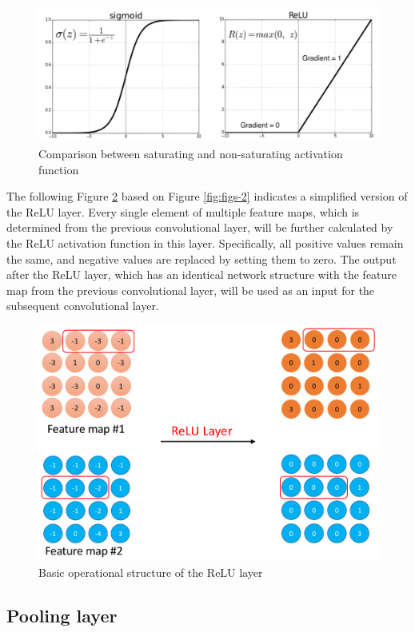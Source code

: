 \documentclass[]{krantz}
\begin{document}
\begin{figure}[ht]

{\centering \includegraphics[width=0.6\linewidth]{figures/01-03-cnns-and-their-applications-in-nlp/ReLU_sigmoid} 

}

\caption{Comparison between saturating and non-saturating activation function }\label{fig:figs-3}
\end{figure}

The following Figure \ref{fig:figs-4} based on Figure \ref{fig:figs-2} indicates a simplified version of the ReLU layer. Every single element of multiple feature maps, which is determined from the previous convolutional layer, will be further calculated by the ReLU activation function in this layer. Specifically, all positive values remain the same, and negative values are replaced by setting them to zero. The output after the ReLU layer, which has an identical network structure with the feature map from the previous convolutional layer, will be used as an input for the subsequent convolutional layer.

\begin{figure}[ht]

{\centering \includegraphics[width=0.5\linewidth]{figures/01-03-cnns-and-their-applications-in-nlp/ReLU} 

}

\caption{Basic operational structure of the ReLU layer }\label{fig:figs-4}
\end{figure}

\hypertarget{pooling-layer}{%
\subsection{Pooling layer}\label{pooling-layer}}
\end{document}
